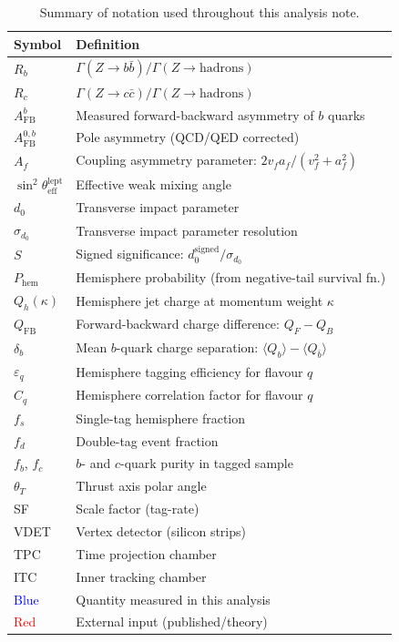\documentclass[11pt,a4paper]{article}
\newcommand{\measured}[1]{\textcolor{blue}{#1}}
\newcommand{\external}[1]{\textcolor{red}{#1}}
\begin{document}
\begin{table}[htbp]
\centering
\caption{Summary of notation used throughout this analysis note.}
\label{tbl:notation}
\begin{tabular}{ll}
\toprule
Symbol & Definition \\
\midrule
$R_b$ & $\Gamma(Z \to b\bar{b}) / \Gamma(Z \to \text{hadrons})$ \\
$R_c$ & $\Gamma(Z \to c\bar{c}) / \Gamma(Z \to \text{hadrons})$ \\
$A_\text{FB}^b$ & Measured forward-backward asymmetry of $b$ quarks \\
$A_\text{FB}^{0,b}$ & Pole asymmetry (QCD/QED corrected) \\
$A_f$ & Coupling asymmetry parameter: $2v_f a_f / (v_f^2 + a_f^2)$ \\
$\sin^2\theta_\text{eff}^\text{lept}$ & Effective weak mixing angle \\
$d_0$ & Transverse impact parameter \\
$\sigma_{d_0}$ & Transverse impact parameter resolution \\
$S$ & Signed significance: $d_0^\text{signed} / \sigma_{d_0}$ \\
$P_\text{hem}$ & Hemisphere probability (from negative-tail survival fn.) \\
$Q_h(\kappa)$ & Hemisphere jet charge at momentum weight $\kappa$ \\
$Q_\text{FB}$ & Forward-backward charge difference: $Q_F - Q_B$ \\
$\delta_b$ & Mean $b$-quark charge separation: $\langle Q_b \rangle - \langle Q_{\bar{b}} \rangle$ \\
$\varepsilon_q$ & Hemisphere tagging efficiency for flavour $q$ \\
$C_q$ & Hemisphere correlation factor for flavour $q$ \\
$f_s$ & Single-tag hemisphere fraction \\
$f_d$ & Double-tag event fraction \\
$f_b$, $f_c$ & $b$- and $c$-quark purity in tagged sample \\
$\theta_T$ & Thrust axis polar angle \\
SF & Scale factor (tag-rate) \\
VDET & Vertex detector (silicon strips) \\
TPC & Time projection chamber \\
ITC & Inner tracking chamber \\
\measured{Blue} & Quantity measured in this analysis \\
\external{Red} & External input (published/theory) \\
\bottomrule
\end{tabular}
\end{table}
\end{document}

